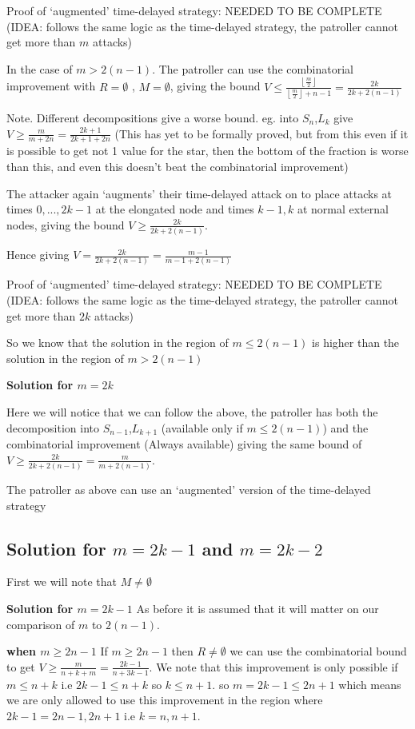 \documentclass[a4paper,10pt]{article}
\newcommand{\floor}[1]{\left \lfloor #1 \right \rfloor}
\theoremstyle{definition}
\theoremstyle{definition}
\theoremstyle{remark}
\theoremstyle{definition}
\begin{document}
Proof of `augmented' time-delayed strategy: NEEDED TO BE COMPLETE (IDEA: follows the same logic as the time-delayed strategy, the patroller cannot get more than $m$ attacks)

In the case of $m > 2(n-1)$.
The patroller can use the combinatorial improvement with $R=\emptyset$ , $M=\emptyset$, giving the bound $V \leq \frac{\floor{\frac{m}{2}}}{\floor{\frac{m}{2}}+n-1} = \frac{2k}{2k+2(n-1)}$

Note. Different decompositions give a worse bound. eg. into $S_{n}$,$L_{k}$ give $V \geq \frac{m}{m+2n}=\frac{2k+1}{2k+1+2n}$ (This has yet to be formally proved, but from this even if it is possible to get not 1 value for the star, then the bottom of the fraction is worse than this, and even this doesn't beat the combinatorial improvement)

The attacker again `augments' their time-delayed attack on to place attacks at times $0,...,2k-1$ at the elongated node and times $k-1,k$ at normal external nodes, giving the bound $V \geq \frac{2k}{2k+2(n-1)}$.

Hence giving $V=\frac{2k}{2k+2(n-1)}=\frac{m-1}{m-1+2(n-1)}$

Proof of `augmented' time-delayed strategy: NEEDED TO BE COMPLETE (IDEA: follows the same logic as the time-delayed strategy, the patroller cannot get more than $2k$ attacks)

So we know that the solution in the region of $m \leq 2(n-1)$ is higher than the solution in the region of $m > 2(n-1)$

\textbf{Solution for $m=2k$}

Here we will notice that we can follow the above, the patroller has both the decomposition into $S_{n-1}$,$L_{k+1}$ (available only if $m \leq 2(n-1)$) and the combinatorial improvement (Always available) giving the same bound of $V \geq \frac{2k}{2k+2(n-1)}=\frac{m}{m+2(n-1)}$.

The patroller as above can use an `augmented' version of the time-delayed strategy 

\subsection{Solution for $m=2k-1$ and $m=2k-2$}
First we will note that $M \neq \emptyset$

\textbf{Solution for $m=2k-1$}
As before it is assumed that it will matter on our comparison of $m$ to $2(n-1)$.

\textbf{when $m \geq 2n-1$}
If $m \geq 2n-1$ then $R \neq \emptyset$ we can use the combinatorial bound to get $V \geq \frac{m}{n+k+m}=\frac{2k-1}{n+3k-1}$. We note that this improvement is only possible if $m \leq n+k$ i.e $2k-1 \leq n+k$ so $k \leq n+1$. so $m=2k-1 \leq 2n+1$ which means we are only allowed to use this improvement in the region where $2k-1=2n-1, 2n+1$ i.e $k=n,n+1$.
\end{document}
